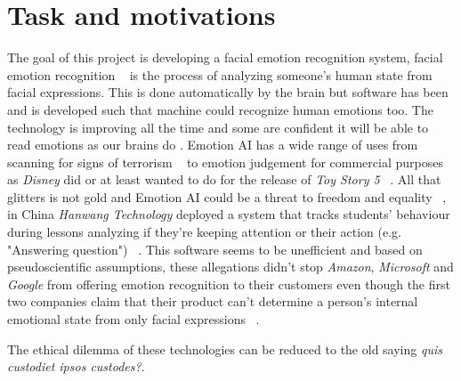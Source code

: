 \section{Task and motivations}
The goal of this project is developing a facial emotion recognition system, facial emotion recognition ~\cite{blog:facial_recognition} is the process of analyzing someone's human state from facial expressions.
This is done automatically by the brain but software has been and is developed such that machine could recognize human emotions too. 
The technology is improving all the time and some are confident it will be able to read emotions as our brains do .
Emotion AI has a wide range of uses from scanning for signs of terrorism ~\cite{blog:terrorism} to emotion judgement for commercial purposes as \textit{Disney} did or at least wanted to do for the release of \textit{Toy Story 5} ~\cite{blog:disney}.
All that glitters is not gold and Emotion AI could be a threat to freedom and equality ~\cite{blog:china1}, in China \textit{Hanwang Technology} deployed a system that tracks students' behaviour during lessons analyzing if they're keeping attention or their action (e.g. "Answering question") ~\cite{blog:china3}. 
This software seems to be unefficient and based on pseudoscientific assumptions, these allegations didn't stop \textit{Amazon}, \textit{Microsoft} and \textit{Google} from offering emotion recognition to their customers even though the first two companies claim that their product can't determine a person's internal emotional state from only facial expressions ~\cite{blog:china2}. 

The ethical dilemma of these technologies can be reduced to the old saying \textit{quis custodiet ipsos custodes?}. 